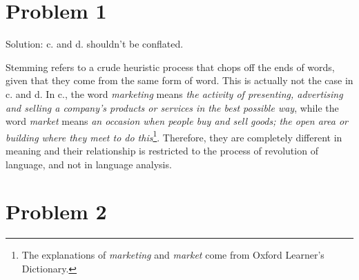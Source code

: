 \section{Problem 1}

Solution: c. and d. shouldn't be conflated.

Stemming refers to a crude heuristic process that chops off the ends of words, given that they come from the same form of word. This is actually not the case in c. and d. In c., the word \textit{marketing} means \textit{the activity of presenting, advertising and selling a company’s products or services in the best possible way}, while the word \textit{market} means \textit{an occasion when people buy and sell goods; the open area or building where they meet to do this}\footnote{The explanations of \textit{marketing} and \textit{market} come from Oxford Learner's Dictionary.}. Therefore, they are completely different in meaning and their relationship is restricted to the process of revolution of language, and not in language analysis.

\section{Problem 2}

